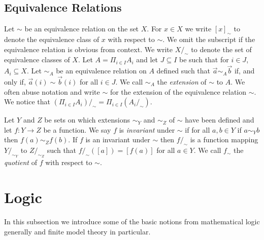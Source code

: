 \documentclass[../main/thesis.tex]{subfiles}
\begin{document}
\subsection{Equivalence Relations}
Let $\sim$ be an equivalence relation on the set $X$. For $x \in X$ we write
$[x]_\sim$ to denote the equivalence class of $x$ with respect to $\sim$. We
omit the subscript if the equivalence relation is obvious from context. We write
$X/_{\sim}$ to denote the set of equivalence classes of $X$. Let $A = \Pi_{i \in
  I} A_i$ and let $J \subseteq I$ be such that for $i \in J$, $A_i \subseteq X$.
Let $\sim_A$ be an equivalence relation on $A$ defined such that $\vec{a} \sim_A
\vec{b}$ if, and only if, $\vec{a}(i) \sim \vec{b}(i)$ for all $i \in J$. We
call $\sim_A$ the \emph{extension} of $\sim$ to $A$. We often abuse notation and
write $\sim$ for the extension of the equivalence relation $\sim$. We notice
that $(\Pi_{i \in I} A_i) /_{\sim} = \Pi_{i \in I} (A_i /_\sim)$.

Let $Y$ and $Z$ be sets on which extensions $\sim_Y$ and $\sim_Z$ of $\sim$ have
been defined and let $f : Y \rightarrow Z$ be a function. We say $f$ is
\emph{invariant} under $\sim$ if for all $a, b \in Y$ if $a \sim_Y b$ then $f(a)
\sim_Z f(b)$. If $f$ is an invariant under $\sim$ then $f /_{\sim}$ is a
function mapping $Y /_{\sim_Y} $ to $ Z /_{\sim_Z}$ such that $f /_{\sim} ([a])
= [f(a)]$ for all $a \in Y$. We call $f_{\sim}$ the \emph{quotient} of $f$ with
respect to $\sim$.


\section{Logic}
In this subsection we introduce some of the basic notions from mathematical
logic generally and finite model theory in particular.
\end{document}
